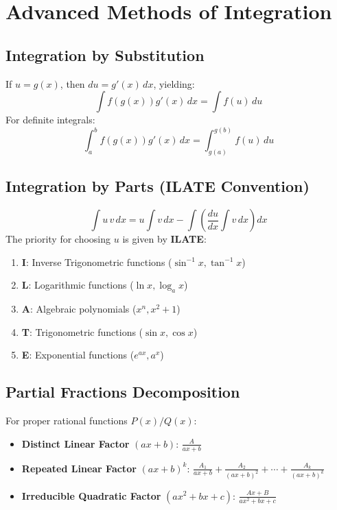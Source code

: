 \section{Advanced Methods of Integration}

\subsection{Integration by Substitution}
If $u = g(x)$, then $du = g'(x)\,dx$, yielding:
\begin{equation}
\int f(g(x)) g'(x)\,dx = \int f(u)\,du
\end{equation}
For definite integrals:
\begin{equation}
\int_a^b f(g(x)) g'(x)\,dx = \int_{g(a)}^{g(b)} f(u)\,du
\end{equation}

\subsection{Integration by Parts (ILATE Convention)}
\begin{equation}
\int u\,v\,dx = u \int v\,dx - \int \left( \frac{du}{dx} \int v\,dx \right) dx
\end{equation}
The priority for choosing $u$ is given by \textbf{ILATE}:
\begin{enumerate}
    \item \textbf{I}: Inverse Trigonometric functions ($\sin^{-1}x, \tan^{-1}x$)
    \item \textbf{L}: Logarithmic functions ($\ln x, \log_a x$)
    \item \textbf{A}: Algebraic polynomials ($x^n, x^2+1$)
    \item \textbf{T}: Trigonometric functions ($\sin x, \cos x$)
    \item \textbf{E}: Exponential functions ($e^{ax}, a^x$)
\end{enumerate}

\subsection{Partial Fractions Decomposition}
For proper rational functions $P(x)/Q(x)$:
\begin{itemize}[leftmargin=1.5em]
    \item \textbf{Distinct Linear Factor} $(ax+b)$: $\frac{A}{ax+b}$
    \item \textbf{Repeated Linear Factor} $(ax+b)^k$: $\frac{A_1}{ax+b} + \frac{A_2}{(ax+b)^2} + \cdots + \frac{A_k}{(ax+b)^k}$
    \item \textbf{Irreducible Quadratic Factor} $(ax^2+bx+c)$: $\frac{Ax+B}{ax^2+bx+c}$
\end{itemize}

